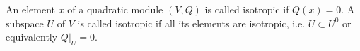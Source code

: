 An element $x$ of a quadratic module $(V, Q)$ is called isotropic if $Q(x) = 0$. A subspace $U$ of $V$ is called isotropic if all its elements are isotropic, i.e. $U \subset U^0$ or equivalently $Q|_U = 0$.
